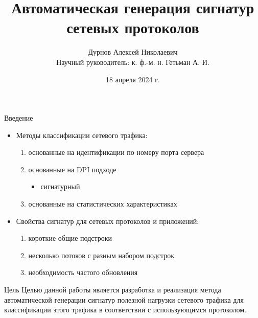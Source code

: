 \documentclass[10pt]{beamer}
\title{Автоматическая генерация сигнатур сетевых протоколов}
\date{18 апреля 2024 г.}
\author{{Дурнов Алексей Николаевич}\\
{Научный руководитель: к. ф.-м. н. Гетьман А. И.}
}
\institute{МФТИ, кафедра системного программирования, ИСП РАН}
\begin{document}
\maketitle

\begin{frame}{Введение}
    \begin{itemize}
      \item Методы классификации сетевого трафика:
        \begin{enumerate}
            \item основанные на идентификации по номеру порта сервера
            \item основанные на DPI подходе
            \begin{itemize}
                \item \alert{сигнатурный}
            \end{itemize}
            \item основанные на статистических характеристиках
        \end{enumerate}
        \item Свойства сигнатур для сетевых протоколов и приложений:
        \begin{enumerate}
            \item короткие общие подстроки
            \item несколько потоков с разным набором подстрок
            \item необходимость частого обновления
        \end{enumerate}
    \end{itemize}
\end{frame}

\begin{frame}{Цель}
    Целью данной работы является разработка и реализация метода автоматической
    генерации сигнатур полезной нагрузки сетевого трафика для классификации этого трафика
    в соответствии с использующимся протоколом.
\end{frame}
\end{document}
